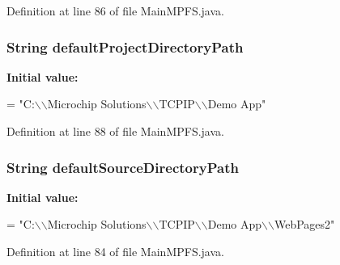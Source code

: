 Definition at line 86 of file Main\+M\+P\+F\+S.\+java.

\hypertarget{class_microchip_m_p_f_s_1_1_main_m_p_f_s_abc264631553d3bfab94dcf0cd9688f31}{}
\subsubsection[{default\+Project\+Directory\+Path}]{\setlength{\rightskip}{0pt plus 5cm}String default\+Project\+Directory\+Path}\label{class_microchip_m_p_f_s_1_1_main_m_p_f_s_abc264631553d3bfab94dcf0cd9688f31}
{\bfseries Initial value\+:}
\begin{DoxyCode}
=
             \textcolor{stringliteral}{"C:\(\backslash\)\(\backslash\)Microchip Solutions\(\backslash\)\(\backslash\)TCPIP\(\backslash\)\(\backslash\)Demo App"}
\end{DoxyCode}


Definition at line 88 of file Main\+M\+P\+F\+S.\+java.

\hypertarget{class_microchip_m_p_f_s_1_1_main_m_p_f_s_ac3d1951443d32a1080f6c6a0461fb96b}{}
\subsubsection[{default\+Source\+Directory\+Path}]{\setlength{\rightskip}{0pt plus 5cm}String default\+Source\+Directory\+Path}\label{class_microchip_m_p_f_s_1_1_main_m_p_f_s_ac3d1951443d32a1080f6c6a0461fb96b}
{\bfseries Initial value\+:}
\begin{DoxyCode}
=
            \textcolor{stringliteral}{"C:\(\backslash\)\(\backslash\)Microchip Solutions\(\backslash\)\(\backslash\)TCPIP\(\backslash\)\(\backslash\)Demo App\(\backslash\)\(\backslash\)WebPages2"}
\end{DoxyCode}


Definition at line 84 of file Main\+M\+P\+F\+S.\+java.

